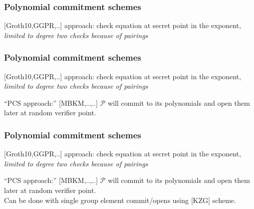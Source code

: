 \documentclass[shadesubsections,trans,14pt,mathserif]{beamer}
\newcommand{\prv}{\ensuremath{\mathcal{P}}}
\newcommand{\spac}{\\  \vspace{0.2in} \noindent}
\begin{document}
 \begin{frame}
\frametitle{Polynomial commitment schemes}   %

{\small{[Groth10,GGPR,..]}} approach: check equation at secret point in the exponent, \emph{limited to degree two checks because of pairings}\\
 \vspace{0.2in}
\noindent

 
\end{frame}
 \begin{frame}
\frametitle{Polynomial commitment schemes}   %

{\small{[Groth10,GGPR,..]}} approach: check equation at secret point in the exponent, \emph{limited to degree two checks because of pairings}\\
 \vspace{0.2in}
\noindent

``PCS approach:'' {\small{[MBKM,..,..]}}  $\prv$ will commit to its polynomials
and open them later at random verifier point. 
 
 
\end{frame}
 \begin{frame}
\frametitle{Polynomial commitment schemes}   %

{\small{[Groth10,GGPR,..]}} approach: check equation at secret point in the exponent, \emph{limited to degree two checks because of pairings}\\
 \vspace{0.2in}
\noindent

``PCS approach:'' {\small{[MBKM,..,..]}}  $\prv$ will commit to its polynomials
and open them later at random verifier point. \spac
Can be done with single group element commit/opens using {\small [KZG]} scheme.
 
 
\end{frame}
\end{document}
